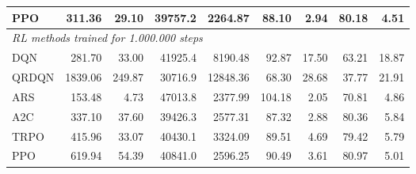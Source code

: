 \begin{samepage}
\begin{center}
\begin{tabular}{l|rr|rr|rr|rr}
    PPO          &   311.36 &    29.10 &    39757.2 &    2264.87 &   88.10 &    2.94 &   80.18 &    4.51 \\
    \midrule
    \multicolumn{9}{l}{\textit{RL methods trained for 1.000.000 steps}} \\
    \midrule
    DQN          &   281.70 &    33.00 &    41925.4 &    8190.48 &   92.87 &   17.50 &   63.21 &   18.87 \\
    QRDQN        &  1839.06 &   249.87 &    30716.9 &   12848.36 &   68.30 &   28.68 &   37.77 &   21.91 \\
    ARS          &   153.48 &     4.73 &    47013.8 &    2377.99 &  104.18 &    2.05 &   70.81 &    4.86 \\
    A2C          &   337.10 &    37.60 &    39426.3 &    2577.31 &   87.32 &    2.88 &   80.36 &    5.84 \\
    TRPO         &   415.96 &    33.07 &    40430.1 &    3324.09 &   89.51 &    4.69 &   79.42 &    5.79 \\
    PPO          &   619.94 &    54.39 &    40841.0 &    2596.25 &   90.49 &    3.61 &   80.97 &    5.01 \\
    \bottomrule
  \end{tabular}
\end{center}
\end{samepage}

